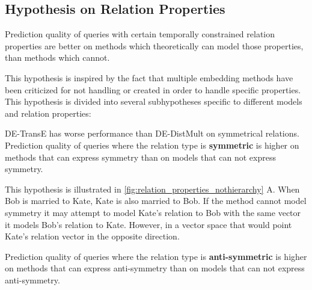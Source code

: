 \subsection{Hypothesis on Relation Properties}
\label{sec:hypothesis_relation_properties}



\begin{hypothesis}
\label{hyp:relation_properties}
Prediction quality of queries with certain temporally constrained relation properties are better on methods which theoretically can model those properties, than methods which cannot.
\end{hypothesis}

This hypothesis is inspired by the fact that multiple embedding methods have been criticized for not handling or created in order to handle specific properties.
\missing[Examples]
This hypothesis is divided into several subhypotheses specific to different models and relation properties:

\begin{subhypothesis}
DE-TransE has worse performance than DE-DistMult on symmetrical relations.
Prediction quality of queries where the relation type is \textbf{symmetric} is higher on methods that can express symmetry than on models that can not express symmetry.
\end{subhypothesis}

This hypothesis is illustrated in \autoref{fig:relation_properties_nothierarchy} A. When Bob is married to Kate, Kate is also married to Bob. If the method cannot model symmetry it may attempt to model Kate's relation to Bob with the same vector it models Bob's relation to Kate. However, in a vector space that would point Kate's relation vector in the opposite direction.

\begin{subhypothesis}
Prediction quality of queries where the relation type is \textbf{anti-symmetric} is higher on methods that can express anti-symmetry than on models that can not express anti-symmetry.
\end{subhypothesis}

